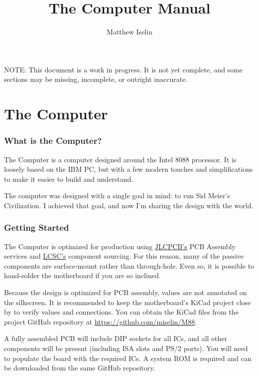 \documentclass[twoside,10pt,letterpaper]{refart}
\title{The \m88 Computer Manual}
\author{Matthew Iselin}
\date{}
\begin{document}
\maketitle
\raggedright
\footnotesize

NOTE: This document is a work in progress. It is not yet complete, and some sections may be missing, incomplete, or outright inaccurate.

\tableofcontents

\newpage

\part{The  Computer}

\section{What is the  Computer?}
The  Computer is a computer designed around the Intel 8088 processor.
It is loosely based on the IBM PC, but with a few modern touches and simplifications
to make it easier to build and understand.

The computer was designed with a single goal in mind: to run Sid Meier's Civilization.
I achieved that goal, and now I'm sharing the design with the world.

\section{Getting Started}
The  Computer is optimized for production using \href{https://jlcpcb.com}{JLCPCB's}
PCB Assembly services and \href{https://lcsc.com}{LCSC's} component sourcing. For this reason,
many of the passive components are surface-mount rather than through-hole. Even so, it is
possible to hand-solder the motherboard if you are so inclined.

Because the design is optimized for PCB assembly, values are not annotated on the silkscreen.
It is recommended to keep the motherboard's KiCad project close by to verify values and connections.
You can obtain the KiCad files from the project GitHub repository at \url{https://github.com/miselin/M88}.

A fully assembled PCB will include DIP sockets for all ICs, and all other components will be
present (including ISA slots and PS/2 ports). You will need to populate the board with the
required ICs. A system ROM is required and can be downloaded from the same GitHub repository.
\end{document}
